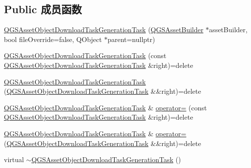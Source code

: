 \subsection*{Public 成员函数}
\begin{DoxyCompactItemize}
\item 
\mbox{\hyperlink{class_q_g_s_asset_object_download_task_generation_task_a121162585d3d9a6098a1ba98829f5df1}{Q\+G\+S\+Asset\+Object\+Download\+Task\+Generation\+Task}} (\mbox{\hyperlink{class_q_g_s_asset_builder}{Q\+G\+S\+Asset\+Builder}} $\ast$asset\+Builder, bool file\+Override=false, Q\+Object $\ast$parent=nullptr)
\item 
\mbox{\hyperlink{class_q_g_s_asset_object_download_task_generation_task_af22975e8e8fdb040c8bbc6725f026fee}{Q\+G\+S\+Asset\+Object\+Download\+Task\+Generation\+Task}} (const \mbox{\hyperlink{class_q_g_s_asset_object_download_task_generation_task}{Q\+G\+S\+Asset\+Object\+Download\+Task\+Generation\+Task}} \&right)=delete
\item 
\mbox{\hyperlink{class_q_g_s_asset_object_download_task_generation_task_a78594bb301c2a833a105e2fb11a81297}{Q\+G\+S\+Asset\+Object\+Download\+Task\+Generation\+Task}} (\mbox{\hyperlink{class_q_g_s_asset_object_download_task_generation_task}{Q\+G\+S\+Asset\+Object\+Download\+Task\+Generation\+Task}} \&\&right)=delete
\item 
\mbox{\hyperlink{class_q_g_s_asset_object_download_task_generation_task}{Q\+G\+S\+Asset\+Object\+Download\+Task\+Generation\+Task}} \& \mbox{\hyperlink{class_q_g_s_asset_object_download_task_generation_task_a66f6f98f6001d784f84245acf27eeb08}{operator=}} (const \mbox{\hyperlink{class_q_g_s_asset_object_download_task_generation_task}{Q\+G\+S\+Asset\+Object\+Download\+Task\+Generation\+Task}} \&right)=delete
\item 
\mbox{\hyperlink{class_q_g_s_asset_object_download_task_generation_task}{Q\+G\+S\+Asset\+Object\+Download\+Task\+Generation\+Task}} \& \mbox{\hyperlink{class_q_g_s_asset_object_download_task_generation_task_a3f76bd93d91a86a19a1e36fc6dae588b}{operator=}} (\mbox{\hyperlink{class_q_g_s_asset_object_download_task_generation_task}{Q\+G\+S\+Asset\+Object\+Download\+Task\+Generation\+Task}} \&\&right)=delete
\item 
virtual \mbox{\hyperlink{class_q_g_s_asset_object_download_task_generation_task_a18ba82c6a2ecfa3c31bbf6d6d149689f}{$\sim$\+Q\+G\+S\+Asset\+Object\+Download\+Task\+Generation\+Task}} ()
\end{DoxyCompactItemize}
